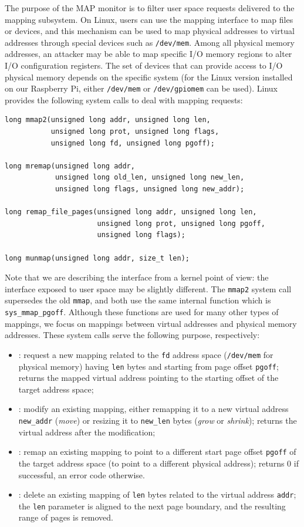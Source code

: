 The purpose of the MAP monitor is to filter user space requests delivered to the mapping subsystem. On Linux, users can use the mapping interface to
map files or devices, and this mechanism can be used to map physical addresses to virtual addresses through special devices such as \verb|/dev/mem|.
Among all physical memory addresses, an attacker may be able to map specific I/O memory regions to alter I/O configuration registers.
The set of devices that can provide access to I/O physical memory depends on the specific system
(\eg for the Linux version installed on our Raspberry Pi, either \verb|/dev/mem| or \verb|/dev/gpiomem| can be used).
Linux provides the following system calls to deal with mapping requests:
\begin{lstlisting}
long mmap2(unsigned long addr, unsigned long len,
           unsigned long prot, unsigned long flags,
           unsigned long fd, unsigned long pgoff);

long mremap(unsigned long addr,
            unsigned long old_len, unsigned long new_len,
            unsigned long flags, unsigned long new_addr);

long remap_file_pages(unsigned long addr, unsigned long len,
                      unsigned long prot, unsigned long pgoff,
                      unsigned long flags);

long munmap(unsigned long addr, size_t len);
\end{lstlisting}
Note that we are describing the interface from a kernel point of view: the interface exposed to user space may be slightly different.
The \verb|mmap2| system call supersedes the old \verb|mmap|, and both use the same internal function which is \verb|sys_mmap_pgoff|.
Although these functions are used for many other types of mappings, we focus on mappings between virtual addresses and physical memory addresses.
These system calls serve the following purpose, respectively:
\begin{itemize}
	\item {}: request a new mapping related to the \verb|fd| address space (\eg \verb|/dev/mem| for physical memory) having \verb|len| bytes
		and starting from page offset \verb|pgoff|; returns the mapped virtual address pointing to the starting offset of the target address space;
	\item {}: modify an existing mapping, either remapping it to a new virtual address \verb|new_addr| (\emph{move})
		or resizing it to \verb|new_len| bytes (\emph{grow} or \emph{shrink}); returns the virtual address after the modification;
	\item {}: remap an existing mapping to point to a different start page offset \verb|pgoff| of the target address space
		(\eg to point to a different physical address); returns $0$ if successful, an error code otherwise.
	\item {}: delete an existing mapping of \verb|len| bytes related to the virtual address \verb|addr|;
		the \verb|len| parameter is aligned to the next page boundary, and the resulting range of pages is removed.
\end{itemize}
